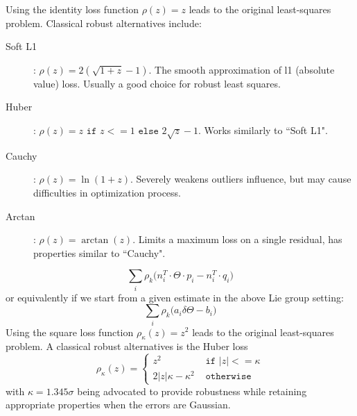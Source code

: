 Using the identity loss function $\rho(z)=z$ leads to the original least-squares problem. Classical robust alternatives include:
\begin{description}
  \item[Soft L1]:
  $\rho(z) = 2 (\sqrt{1 + z} - 1)$.
  The smooth approximation of l1 (absolute value) loss. Usually a good choice for robust least squares.

  \item[Huber]:
  $\rho(z) = z \texttt{ if } z <= 1 \texttt{ else } 2\sqrt{z} - 1$.
  Works similarly to ``Soft L1".

  \item[Cauchy]:
  $\rho(z) = \ln(1 + z)$.
  Severely weakens outliers influence, but may cause difficulties in optimization process.

   \item[Arctan]:
   $\rho(z) = \arctan(z)$.
   Limits a maximum loss on a single residual, has properties similar to ``Cauchy".
\end{description}
\fi
\begin{equation}
\sum_i \rho_k\Big(n_i^T \cdot \Theta \cdot p_i - n_i^T \cdot q_i\Big)
\end{equation}
or equivalently if we start from a given estimate in the above Lie group setting:
\begin{equation}
\sum_i \rho_k\Big(a_i \delta\Theta - b_i\Big)
\end{equation}
%
Using the square loss function $\rho_\kappa(z)=z^2$ leads to the original least-squares problem. A classical robust alternatives is the Huber loss
\begin{equation}
\rho_\kappa(z) =
\begin{cases}
  z^2 &\texttt{ if } |z| <= \kappa \\
  2|z|\kappa - \kappa^2  &\texttt{ otherwise }
\end{cases}
\end{equation}
with $\kappa=1.345\sigma$ being advocated to provide robustness while retaining appropriate properties when the errors are Gaussian.

